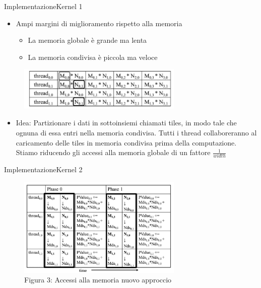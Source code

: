 \documentclass{beamer}
\begin{document}
\begin{frame}{Implementazione}{Kernel 1}
    \begin{itemize}
        \item Ampi margini di miglioramento rispetto alla memoria
        \begin{itemize}
            \item La memoria globale è grande ma lenta
             \item La memoria condivisa è piccola ma veloce
        \end{itemize}
    \end{itemize}
    \begin{figure}[H]
        \centering
        \includegraphics[width=0.7\textwidth]{imgs/memory_access.png}
    \end{figure}
    \begin{itemize}
        \item Idea: Partizionare i dati in sottoinsiemi chiamati tiles, in modo tale che ognuna di essa entri nella memoria condivisa. Tutti i thread collaboreranno al caricamento delle tiles in memoria condivisa prima della computazione. Stiamo riducendo gli accessi alla memoria globale di un fattore $\frac{1}{width}$
    \end{itemize}
\end{frame}

\begin{frame}{Implementazione}{Kernel 2}
    \begin{figure}[H]
        \centering
        \includegraphics[width=0.7\textwidth]{imgs/memory_access1.png}
        \caption{Figura 3: Accessi alla memoria nuovo approccio}
    \end{figure}
\end{frame}
\end{document}
